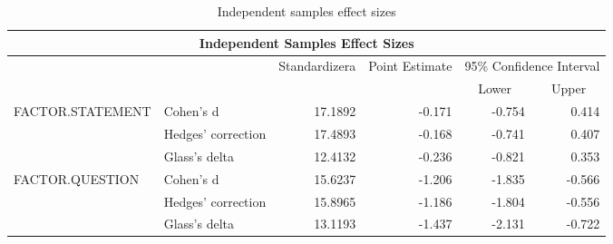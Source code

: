 \documentclass[a4paper]{article}
\begin{document}
\begin{table}[H]
\centering
\caption{Independent samples effect sizes}
\label{tab:effect}
\begin{tabular}{|l|l|r|r|r|r|} 
\hline
\multicolumn{6}{|c|}{Independent Samples Effect Sizes}                                                                                                                                                                         \\ 
\hline
                                  &                    & \multicolumn{1}{c|}{\multirow{2}{*}{Standardizera}} & \multicolumn{1}{c|}{\multirow{2}{*}{Point Estimate}} & \multicolumn{2}{c|}{95\% Confidence Interval}            \\ 
\cline{1-2}\cline{5-6}
                                  &                    & \multicolumn{1}{c|}{}                               & \multicolumn{1}{c|}{}                                & \multicolumn{1}{c|}{Lower} & \multicolumn{1}{c|}{Upper}  \\ 
\hline
\multirow{3}{*}{FACTOR.STATEMENT} & Cohen's d          & 17.1892                                             & -0.171                                               & -0.754                     & 0.414                       \\ 
\cline{2-6}
                                  & Hedges' correction & 17.4893                                             & -0.168                                               & -0.741                     & 0.407                       \\ 
\cline{2-6}
                                  & Glass's delta      & 12.4132                                             & -0.236                                               & -0.821                     & 0.353                       \\ 
\hline
\multirow{3}{*}{FACTOR.QUESTION}  & Cohen's d          & 15.6237                                             & -1.206                                               & -1.835                     & -0.566                      \\ 
\cline{2-6}
                                  & Hedges' correction & 15.8965                                             & -1.186                                               & -1.804                     & -0.556                      \\ 
\cline{2-6}
                                  & Glass's delta      & 13.1193                                             & -1.437                                               & -2.131                     & -0.722                      \\
\hline
\end{tabular}
\end{table}
\end{document}
